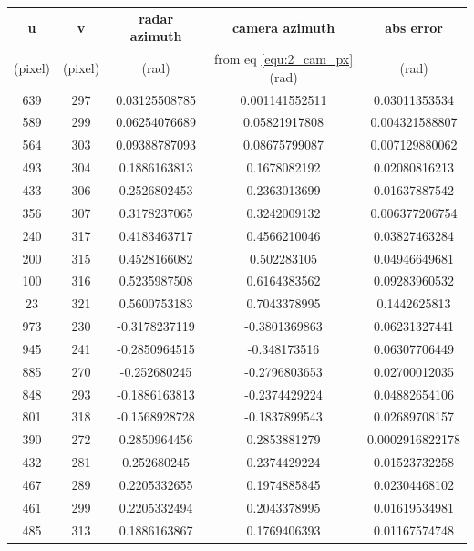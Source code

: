 \begin{table}[htbp]
    \centering
    \begin{tabular}{|c|c|c|c|c|}
    \hline
    \textbf{u} & \textbf{v }  & \textbf{radar azimuth} & \textbf{camera azimuth} & \textbf{abs error} \\ 
    (pixel)   &(pixel)          &(rad)                  &from eq \ref{equ:2_cam_px}(rad)&(rad)\\
    \hline
        639 & 297 & 0.03125508785 & 0.001141552511 & 0.03011353534 \\
        589 & 299 & 0.06254076689 & 0.05821917808 & 0.004321588807 \\
        564 & 303 & 0.09388787093 & 0.08675799087 & 0.007129880062 \\
        493 & 304 & 0.1886163813 & 0.1678082192 & 0.02080816213 \\
        433 & 306 & 0.2526802453 & 0.2363013699 & 0.01637887542 \\
        356 & 307 & 0.3178237065 & 0.3242009132 & 0.006377206754 \\
        240 & 317 & 0.4183463717 & 0.4566210046 & 0.03827463284 \\
        200 & 315 & 0.4528166082 & 0.502283105 & 0.04946649681 \\
        100 & 316 & 0.5235987508 & 0.6164383562 & 0.09283960532 \\
        23 & 321 & 0.5600753183 & 0.7043378995 & 0.1442625813 \\
        973 & 230 & -0.3178237119 & -0.3801369863 & 0.06231327441 \\
        945 & 241 & -0.2850964515 & -0.348173516 & 0.06307706449 \\
        885 & 270 & -0.252680245 & -0.2796803653 & 0.02700012035 \\
        848 & 293 & -0.1886163813 & -0.2374429224 & 0.04882654106 \\
        801 & 318 & -0.1568928728 & -0.1837899543 & 0.02689708157 \\
        390 & 272 & 0.2850964456 & 0.2853881279 & 0.0002916822178 \\
        432 & 281 & 0.252680245 & 0.2374429224 & 0.01523732258 \\
        467 & 289 & 0.2205332655 & 0.1974885845 & 0.02304468102 \\
        461 & 299 & 0.2205332494 & 0.2043378995 & 0.01619534981 \\
        485 & 313 & 0.1886163867 & 0.1769406393 & 0.01167574748 \\

\end{tabular}
\end{table}
